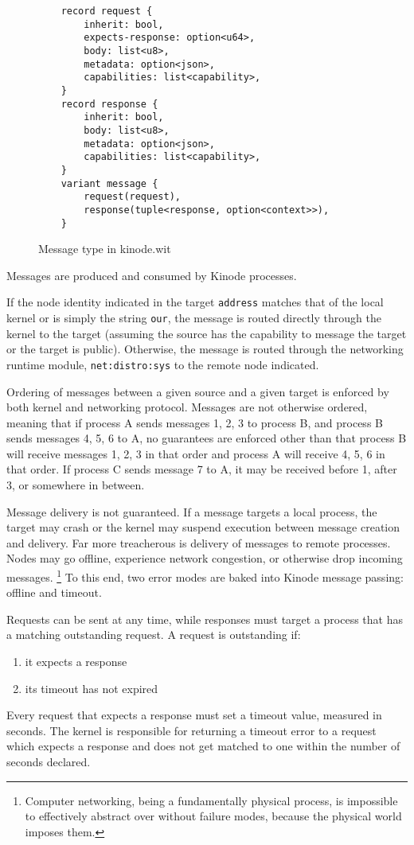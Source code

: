 \documentclass[runningheads]{llncs}
\begin{document}
\begin{figure}[H]
    \centering
    \begin{lstlisting}
    record request {
        inherit: bool,
        expects-response: option<u64>,
        body: list<u8>,
        metadata: option<json>,
        capabilities: list<capability>,
    }
    record response {
        inherit: bool,
        body: list<u8>,
        metadata: option<json>,
        capabilities: list<capability>,
    }
    variant message {
        request(request),
        response(tuple<response, option<context>>),
    }
    \end{lstlisting}
    \caption{Message type in kinode.wit}
    \label{fig:WIT Types 2}
\end{figure}

Messages are produced and consumed by Kinode processes.

If the node identity indicated in the target \verb|address| matches that of the local kernel or is simply the string \verb|our|, the message is routed directly through the kernel to the target (assuming the source has the capability to message the target or the target is public).
Otherwise, the message is routed through the networking runtime module, \verb|net:distro:sys| to the remote node indicated.

Ordering of messages between a given source and a given target is enforced by both kernel and networking protocol.
Messages are not otherwise ordered, meaning that if process A sends messages 1, 2, 3 to process B, and process B sends messages 4, 5, 6 to A, no guarantees are enforced other than that process B will receive messages 1, 2, 3 in that order and process A will receive 4, 5, 6 in that order.
If process C sends message 7 to A, it may be received before 1, after 3, or somewhere in between.

Message delivery is not guaranteed.
If a message targets a local process, the target may crash or the kernel may suspend execution between message creation and delivery.
Far more treacherous is delivery of messages to remote processes.
Nodes may go offline, experience network congestion, or otherwise drop incoming messages.
\footnote{Computer networking, being a fundamentally physical process, is impossible to effectively abstract over without failure modes, because the physical world imposes them.}
To this end, two error modes are baked into Kinode message passing: offline and timeout.

Requests can be sent at any time, while responses must target a process that has a matching outstanding request.
A request is outstanding if:
\begin{enumerate}
    \item it expects a response
    \item its timeout has not expired
\end{enumerate}
Every request that expects a response must set a timeout value, measured in seconds.
The kernel is responsible for returning a timeout error to a request which expects a response and does not get matched to one within the number of seconds declared.
\end{document}
